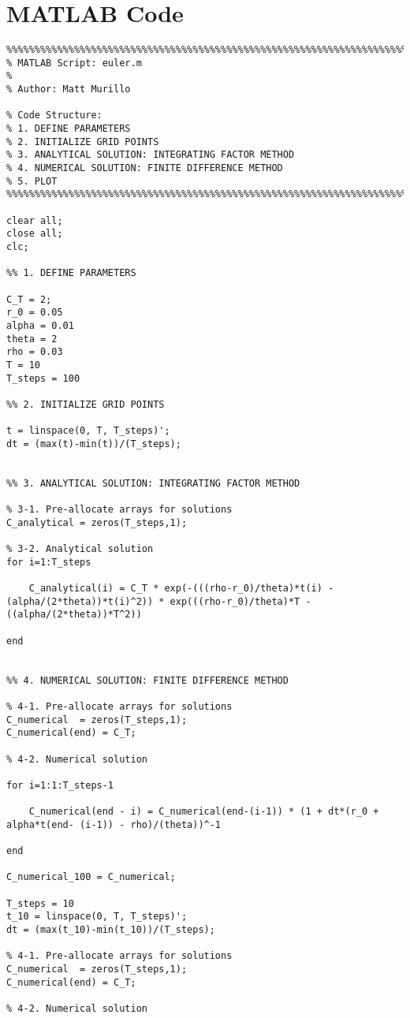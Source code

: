 \section*{MATLAB Code}
\begin{lstlisting}
%%%%%%%%%%%%%%%%%%%%%%%%%%%%%%%%%%%%%%%%%%%%%%%%%%%%%%%%%%%%%%%%%%%%%%%%%%%
% MATLAB Script: euler.m
%
% Author: Matt Murillo

% Code Structure:
% 1. DEFINE PARAMETERS
% 2. INITIALIZE GRID POINTS
% 3. ANALYTICAL SOLUTION: INTEGRATING FACTOR METHOD
% 4. NUMERICAL SOLUTION: FINITE DIFFERENCE METHOD
% 5. PLOT
%%%%%%%%%%%%%%%%%%%%%%%%%%%%%%%%%%%%%%%%%%%%%%%%%%%%%%%%%%%%%%%%%%%%%%%%%%%

clear all; 
close all;
clc;

%% 1. DEFINE PARAMETERS

C_T = 2;
r_0 = 0.05
alpha = 0.01
theta = 2
rho = 0.03
T = 10
T_steps = 100

%% 2. INITIALIZE GRID POINTS

t = linspace(0, T, T_steps)';
dt = (max(t)-min(t))/(T_steps);


%% 3. ANALYTICAL SOLUTION: INTEGRATING FACTOR METHOD

% 3-1. Pre-allocate arrays for solutions
C_analytical = zeros(T_steps,1);

% 3-2. Analytical solution
for i=1:T_steps
   
    C_analytical(i) = C_T * exp(-(((rho-r_0)/theta)*t(i) - (alpha/(2*theta))*t(i)^2)) * exp(((rho-r_0)/theta)*T - ((alpha/(2*theta))*T^2))
    
end


%% 4. NUMERICAL SOLUTION: FINITE DIFFERENCE METHOD

% 4-1. Pre-allocate arrays for solutions
C_numerical  = zeros(T_steps,1);
C_numerical(end) = C_T;

% 4-2. Numerical solution

for i=1:1:T_steps-1
    
    C_numerical(end - i) = C_numerical(end-(i-1)) * (1 + dt*(r_0 + alpha*t(end- (i-1)) - rho)/(theta))^-1
    
end

C_numerical_100 = C_numerical;

T_steps = 10
t_10 = linspace(0, T, T_steps)';
dt = (max(t_10)-min(t_10))/(T_steps);

% 4-1. Pre-allocate arrays for solutions
C_numerical  = zeros(T_steps,1);
C_numerical(end) = C_T;

% 4-2. Numerical solution


\end{lstlisting}
